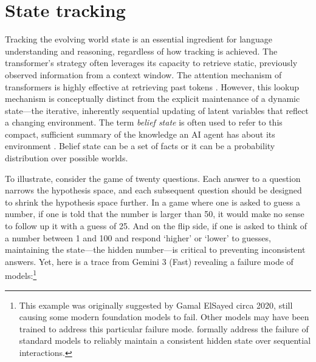 \documentclass{article}
\begin{document}
\section{State tracking}

Tracking the evolving world state is an essential ingredient for 
language understanding and 
reasoning, regardless of how tracking is achieved. The transformer's 
strategy often leverages its capacity to retrieve static, previously 
observed information from a context window. The attention mechanism of 
transformers is highly effective at retrieving past tokens \citep{olsson2022context}.
However,
this lookup mechanism is conceptually distinct from the explicit maintenance
of a dynamic state---the iterative, inherently sequential updating of 
latent variables that reflect a changing environment. The term 
\emph{belief state} is often used to refer to this compact, sufficient 
summary of the knowledge an AI agent has about its environment \citep{Chrisman1992,kaelbling1998planning}.
Belief state can be a set of facts or it can be a probability distribution over possible worlds.

To illustrate, consider the game of twenty questions. Each answer to a question
narrows the hypothesis space, and each subsequent question should be designed
to shrink the hypothesis space further. In a game where one is asked to
guess a number, if one is told that the number is larger than 50, it would 
make no sense to follow up it with a guess of 25. And on the flip side, 
if one is asked to think of a number between 1 and 100 and respond `higher'
or `lower' to guesses, maintaining the state---the hidden number---is critical 
to preventing inconsistent answers. Yet, here is a trace from Gemini 3 (Fast)
revealing a failure mode of models:\footnote{This example was originally suggested
by Gamal ElSayed circa 2020, still causing some modern foundation models to fail. Other models may have been trained to address this particular failure mode. 
\citet{baldelli2026} formally address the failure of standard models to reliably maintain a consistent hidden state over sequential interactions.}
\end{document}
